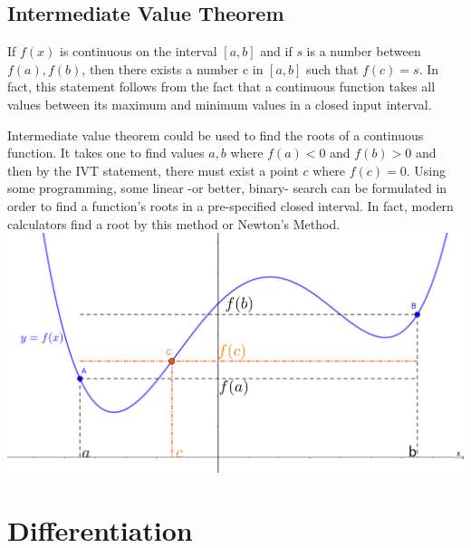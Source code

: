 \documentclass[12pt]{article}
\begin{document}
\subsection{Intermediate Value Theorem}
If $f(x)$ is continuous on the interval $[a,b]$ and if $s$ is a number between $f(a),f(b)$, then there exists a number c in $[a,b]$ such that $f(c)=s$. In fact, this statement follows from the fact that a continuous function takes all values between its maximum and minimum values in a closed input interval.

Intermediate value theorem could be used to find the roots of a continuous function. It takes one to find values $a,b$ where $f(a)<0$ and $f(b)>0$ and then by the IVT statement, there must exist a point $c$ where $f(c)=0$. Using some programming, some linear -or better, binary- search can be formulated in order to find a function's roots in a pre-specified closed interval. In fact, modern calculators find a root by this method or Newton's Method.\\
\includegraphics[scale=0.24]{IVT.png}
\section{Differentiation}
\end{document}
